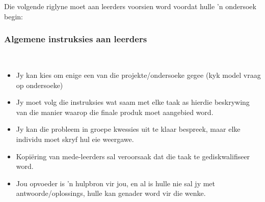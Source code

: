 Die volgende riglyne moet aan leerders voorsien word voordat hulle 'n ondersoek begin:

\subsubsection{Algemene instruksies aan leerders}\\
\begin{itemize}[noitemsep]
\item
  Jy kan kies om enige een van die projekte/ondersoeke gegee (kyk model vraag op ondersoeke)
\item
  Jy moet volg die instruksies wat saam met elke taak as hierdie beskrywing van die manier waarop die finale produk moet aangebied word.
\item
  Jy kan die probleem in groepe kwessies uit te klaar bespreek, maar elke individu moet skryf hul eie weergawe.
\item
  Kopi\"{e}ring van mede-leerders sal veroorsaak dat die taak te gediskwalifiseer word.
\item
  Jou opvoeder is 'n hulpbron vir jou, en al is hulle nie sal jy met antwoorde/oplossings, hulle kan genader word vir die wenke.\end{itemize}	

